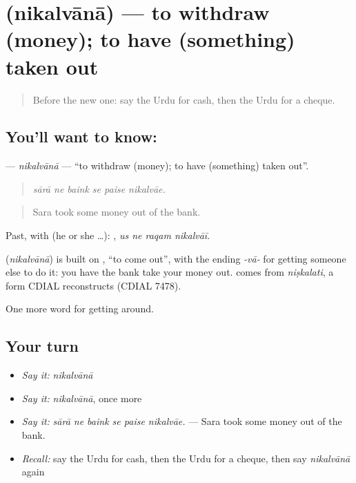 \section[\texorpdfstring{\ur{نکلوانا} (nikalvānā)}{نکلوانا (nikalvānā)}]{ (nikalvānā) — to withdraw (money); to have (something) taken out}

\label{lesson:UR-C417-nikalvana}



\begin{quote}
Before the new one: say the Urdu for cash, then the Urdu for a cheque.
\end{quote}

\subsection*{You'll want to know: }
\textbf{} — \emph{nikalvānā} — \textquotedblleft{}to withdraw (money); to have (something) taken out\textquotedblright{}.

\begin{quote}
     
\end{quote}

\begin{quote}
\emph{sārā ne baink se paise nikalvāe.}
\end{quote}

\begin{quote}
Sara took some money out of the bank.
\end{quote}

Past, with  (he or she …):    , \emph{us ne raqam nikalvāī}.

\begin{cousinweb}
\textbf{} (\emph{nikalvānā}) is built on \textbf{}, \textquotedblleft{}to come out\textquotedblright{}, with the ending \emph{-vā-} for getting someone else to do it: you have the bank take your money out. \textbf{} comes from \emph{niṣkalati}, a form CDIAL reconstructs (CDIAL 7478).
\end{cousinweb}

\begin{grammarlens}[title={What you've built}]
One more word for getting around.
\end{grammarlens}

\subsection*{Your turn}
\begin{itemize}
\raggedright
  \item \emph{Say it:} \emph{nikalvānā}
  \item \emph{Say it:} \emph{nikalvānā}, once more
  \item \emph{Say it:} \emph{sārā ne baink se paise nikalvāe.} — Sara took some money out of the bank.
  \item \emph{Recall:} say the Urdu for cash, then the Urdu for a cheque, then say \emph{nikalvānā} again
\end{itemize}

